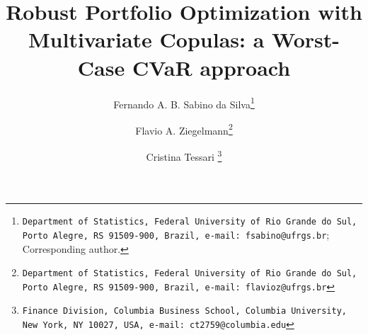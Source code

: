 \documentclass[a4paper,10pt]{article}
\begin{document}
\title{Robust Portfolio Optimization with Multivariate Copulas: a Worst-Case CVaR approach}
\author[]{ Fernando A. B. Sabino da Silva\thanks{\texttt{Department of Statistics, Federal University of Rio Grande do Sul, Porto Alegre, RS 91509-900, Brazil, e-mail: fsabino@ufrgs.br}; Corresponding author.}}
\author[]{Flavio A. Ziegelmann\thanks{\texttt{Department of Statistics, Federal University of Rio Grande do Sul, Porto Alegre, RS 91509-900, Brazil, e-mail: flavioz@ufrgs.br}}}
\author[]{Cristina Tessari \thanks{\texttt{Finance Division, Columbia Business School, Columbia University, New York, NY 10027, USA,
			e-mail: ct2759@columbia.edu}}}
\affil[]{}
\date{}
\maketitle
\end{document}
